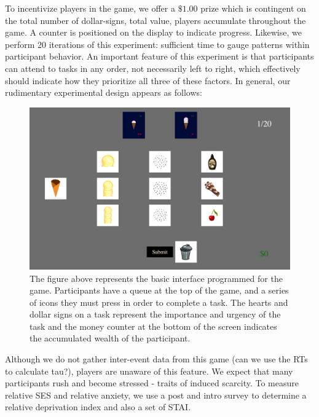 To incentivize players in the game, we offer a \(\$1.00\) prize which is
contingent on the total number of dollar-signs, total value, players
accumulate throughout the game. A counter is positioned on the display
to indicate progress. Likewise, we perform 20 iterations of this
experiment: sufficient time to gauge patterns within participant
behavior. An important feature of this experiment is that participants
can attend to tasks in any order, not necessarily left to right, which
effectively should indicate how they prioritize all three of these
factors. In general, our rudimentary experimental design appears as
follows:

\begin{figure}

{\centering \includegraphics{images/totalice.jpeg}

}

\caption{The figure above represents the basic interface programmed for
the game. Participants have a queue at the top of the game, and a series
of icons they must press in order to complete a task. The hearts and
dollar signs on a task represent the importance and urgency of the task
and the money counter at the bottom of the screen indicates the
accumulated wealth of the participant.}

\end{figure}

Although we do not gather inter-event data from this game (can we use
the RTs to calculate tau?), players are unaware of this feature. We
expect that many participants rush and become stressed - traits of
induced scarcity. To measure relative SES and relative anxiety, we use a
post and intro survey to determine a relative deprivation index and also
a set of STAI.

